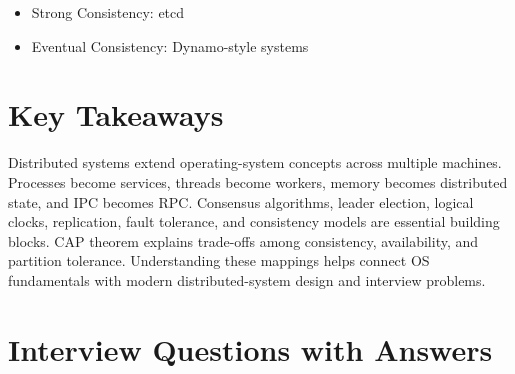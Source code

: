 \begin{itemize}
\item Strong Consistency: etcd
\item Eventual Consistency: Dynamo-style systems
\end{itemize}

\section{Key Takeaways}

\begin{keytakeaways}
Distributed systems extend operating-system concepts across multiple machines. Processes become services, threads become workers, memory becomes distributed state, and IPC becomes RPC. Consensus algorithms, leader election, logical clocks, replication, fault tolerance, and consistency models are essential building blocks. CAP theorem explains trade-offs among consistency, availability, and partition tolerance. Understanding these mappings helps connect OS fundamentals with modern distributed-system design and interview problems.
\end{keytakeaways}

\section{Interview Questions with Answers}

